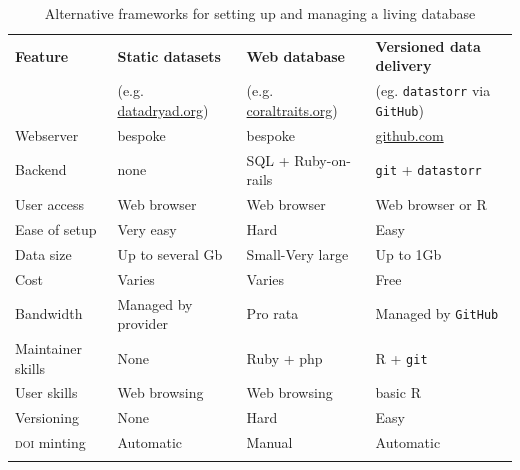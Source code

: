 \documentclass[a4paper,11pt]{article}
\newcommand{\smurl}[1]{{\footnotesize\url{#1}}}
\begin{document}
\begin{table}[h!]
\centering
\caption{Alternative frameworks for setting up and managing a living database}
{\footnotesize
\vspace{1cm}
  \begin{tabular}{p{2.5cm}p{3.5cm}p{3.5cm}p{4cm}}
  \hline
  \textbf{Feature} & \textbf{Static datasets}& \textbf{Web database} & \textbf{Versioned data delivery}\\
  \textbf{} & (e.g. \smurl{datadryad.org})& (e.g. \smurl{coraltraits.org}) & (eg. \texttt{datastorr} via \texttt{GitHub})\\
  \hline
   Webserver        & bespoke & bespoke &  \smurl{github.com}\\
   Backend          & none & SQL + Ruby-on-rails 			& \texttt{git} + \texttt{datastorr} \\
   User access      & Web browser & Web browser 				    & Web browser or R \\
   Ease of setup    & Very easy & Hard 							& Easy\\
   Data size        & Up to several Gb & Small-Very large 				& Up to 1Gb\\
   Cost             & Varies & Varies  						& Free \\
   Bandwidth        & Managed by provider & Pro rata 						& Managed by \texttt{GitHub}\\
   Maintainer skills & None & Ruby + php 					& R + \texttt{git} \\
   User skills      &Web browsing& Web browsing  					& basic R \\
   Versioning       &None& Hard 							& Easy \\
   \textsc{doi} minting      &Automatic & Manual 					& Automatic \\
  \hline 
  \\
 
  \end{tabular}
  } 
\label{tab:sql_v_versioneddata}
\end{table}

\newpage
\end{document}
